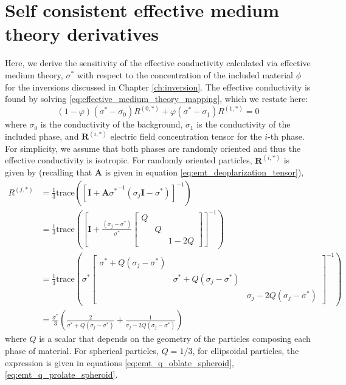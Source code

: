 \chapter{Self consistent effective medium theory derivatives}
\label{app:scemt_derivatives}

Here, we derive the sensitivity of the effective conductivity calculated via effective medium theory, $\sigma^*$ with respect to the concentration of the included material $\phi$ for the inversions discussed in Chapter \ref{ch:inversion}. The effective conductivity is found by solving \ref{eq:effective_medium_theory_mapping}, which we restate here:
\begin{equation}
    (1-\varphi)(\sigma^* - \sigma_0)R^{(0,*)} + \varphi(\sigma^* - \sigma_1)R^{(1,*)}= 0
\label{eq:emt_mapping}
\end{equation}
where $\sigma_0$ is the conductivity of the background, $\sigma_1$ is the conductivity of the included phase, and $\mathbf{R}^{(i,*)}$ electric field concentration tensor for the $i$-th phase. For simplicity, we assume that both phases are randomly oriented and thus the effective conductivity is isotropic. For randomly oriented particles, $\mathbf{R}^{(i,*)}$ is given by (recalling that $\mathbf{A}$ is given in equation \ref{eq:emt_deoplarization_tensor}),
\begin{equation}
\begin{split}
    R^{(j,*)}
    &= \frac{1}{3}\text{trace}\left(
        \left[\mathbf{I}+\mathbf{A}{\sigma^*}^{-1}(\sigma_j\mathbf{I}-\sigma^*)\right]^{-1}
        \right)\\
    &= \frac{1}{3}\text{trace}\left(
        \left[\mathbf{I} +
        \frac{(\sigma_j-\sigma^*)}{\sigma^*}\left[\begin{array}{ccc}
            Q & & \\
            & Q & \\
            & & 1-2Q
        \end{array}\right]
        \right]^{-1}
        \right) \\
    & = \frac{1}{3}\text{trace}\left(
            \sigma^*\left[\begin{array}{ccc}
            \sigma^* + Q(\sigma_j - \sigma^*) & & \\
            & \sigma^* + Q(\sigma_j - \sigma^*) & \\
            & & \sigma_j - 2Q(\sigma_j - \sigma^*)
        \end{array}
            \right]^{-1}
        \right) \\
    & =\frac{\sigma^*}{3}\left( \frac{2}{\sigma^* + Q(\sigma_j - \sigma^*)} + \frac{1}{\sigma_j - 2Q(\sigma_j - \sigma^*)}\right)
\end{split}
\label{eq:emt_r_random}
\end{equation}
where $Q$ is a scalar that depends on the geometry of the particles composing each phase of material. For spherical particles, $Q=1/3$, for ellipsoidal particles, the expression is given in equations \ref{eq:emt_q_oblate_spheroid}, \ref{eq:emt_q_prolate_spheroid}.

